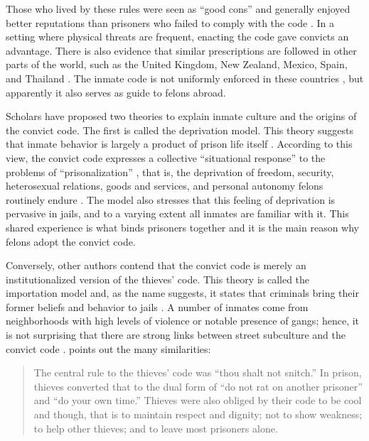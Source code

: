 \documentclass[a4paper, 12pt]{article}
\begin{document}
Those who lived by these rules were seen as ``good cons'' and generally enjoyed better reputations than prisoners who failed to comply with the code \citep{copes2013accounting}. In a setting where physical threats are frequent, enacting the code gave convicts an advantage. There is also evidence that similar prescriptions are followed in other parts of the world, such as the United Kingdom, New Zealand, Mexico, Spain, and Thailand \citep{akers1977prisonization,sirisutthidacha2014patterns,winfree2002prisoner}. The inmate code is not uniformly enforced in these countries \citep[p. 843]{copes2013accounting}, but apparently it also serves as guide to felons abroad.

Scholars have proposed two theories to explain inmate culture and the origins of the convict code. The first is called the deprivation model. This theory suggests that inmate behavior is largely a product of prison life itself \citep{clemmer1940prison,irwin1980prisons,mccorkle1954resocialization}. According to this view, the convict code expresses a collective ``situational response'' \citep{akers1977prisonization} to the problems of ``prisonalization'' \citep{clemmer1940prison}, that is, the deprivation of freedom, security, heterosexual relations, goods and services, and personal autonomy felons routinely endure \citep{sykes1958society}. The model also stresses that this feeling of deprivation is pervasive in jails, and to a varying extent all inmates are familiar with it. This shared experience is what binds prisoners together and it is the main reason why felons adopt the convict code.

Conversely, other authors contend that the convict code is merely an institutionalized version of the thieves' code. This theory is called the importation model and, as the name suggests, it states that criminals bring their former beliefs and behavior to jails   \citep{irwin1962thieves,irwin1970felon,irwin1980prisons}. A number of inmates come from neighborhoods with high levels of violence or notable presence of gangs; hence, it is not surprising that there are strong links between street subculture and the convict code \citep[p. 96]{sirisutthidacha2014patterns}.  \citet[p. 12]{irwin1980prisons} points out the many similarities: 

\begin{quote}
The central rule to the thieves' code was ``thou shalt not snitch.'' In prison, thieves converted that to the dual form of ``do not rat on another prisoner'' and ``do your own time.'' Thieves were also obliged by their code to be cool and though, that is to maintain respect and dignity; not to show weakness; to help other thieves; and to leave most prisoners alone.
\end{quote}
\end{document}
